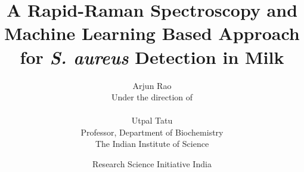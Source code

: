 

\title{A Rapid-Raman Spectroscopy and Machine Learning Based Approach for \textit{S. aureus} Detection in Milk}

\author{
Arjun Rao
\vspace{0.5in}\\
Under the direction of\\
\\
Utpal Tatu\\
Professor, Department of Biochemistry\\
The Indian Institute of Science\\
\vspace{1in}
}

\date{
Research Science Initiative India\\
\rsifinalpaperdate
}
